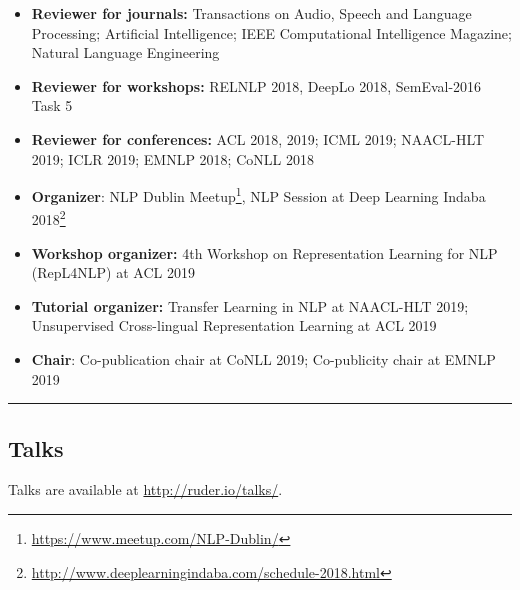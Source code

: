 \documentclass[10pt,letterpaper]{article}
\begin{document}
\begin{itemize}
	\parskip=0.1em
	
	\item \textbf{Reviewer for journals:} Transactions on Audio, Speech and Language Processing; Artificial Intelligence; IEEE Computational Intelligence Magazine; Natural Language Engineering
	
	\item \textbf{Reviewer for workshops:} RELNLP 2018, DeepLo 2018, SemEval-2016 Task 5
		
	\item \textbf{Reviewer for conferences:} ACL 2018, 2019; ICML 2019; NAACL-HLT 2019; ICLR 2019; EMNLP 2018; CoNLL 2018
	
	\item \textbf{Organizer}: NLP Dublin Meetup\footnote{\url{https://www.meetup.com/NLP-Dublin/}}, NLP Session at Deep Learning Indaba 2018\footnote{\url{http://www.deeplearningindaba.com/schedule-2018.html}}
	
	\item \textbf{Workshop organizer:} 4th Workshop on Representation Learning for NLP (RepL4NLP) at ACL 2019
	
	\item \textbf{Tutorial organizer:} Transfer Learning in NLP at NAACL-HLT 2019; Unsupervised Cross-lingual Representation Learning at ACL 2019
	
	\item \textbf{Chair}: Co-publication chair at CoNLL 2019; Co-publicity chair at EMNLP 2019

\end{itemize}

\hrule
\vspace{-0.4em}
\subsection*{Talks}

Talks are available at \url{http://ruder.io/talks/}.
\end{document}
